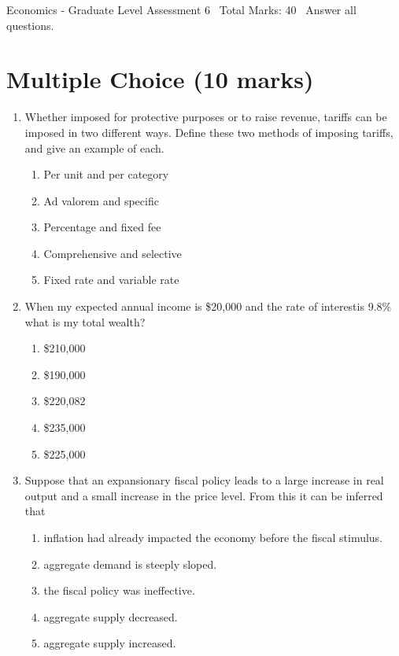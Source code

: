 \documentclass[12pt]{article}
\begin{document}
\begin{center}
Economics - Graduate Level Assessment 6 \
Total Marks: 40 \
Answer all questions.
\end{center}

\section*{Multiple Choice (10 marks)}
\begin{enumerate}[label=\arabic*.]
\item Whether imposed for protective purposes or to raise revenue, tariffs can be imposed in two different ways. Define these two methods of imposing tariffs, and give an example of each.
\begin{enumerate}[label=(\alph*)]
    \item Per unit and per category
    \item Ad valorem and specific
    \item Percentage and fixed fee
    \item Comprehensive and selective
    \item Fixed rate and variable rate
\end{enumerate}
\item When my expected annual income is \$20,000 and the rate of interestis 9.8\% what is my total wealth?
\begin{enumerate}[label=(\alph*)]
    \item \$210,000
    \item \$190,000
    \item \$220,082
    \item \$235,000
    \item \$225,000
\end{enumerate}
\item Suppose that an expansionary fiscal policy leads to a large increase in real output and a small increase in the price level. From this it can be inferred that
\begin{enumerate}[label=(\alph*)]
    \item inflation had already impacted the economy before the fiscal stimulus.
    \item aggregate demand is steeply sloped.
    \item the fiscal policy was ineffective.
    \item aggregate supply decreased.
    \item aggregate supply increased.
\end{enumerate}

\end{enumerate}
\end{document}
